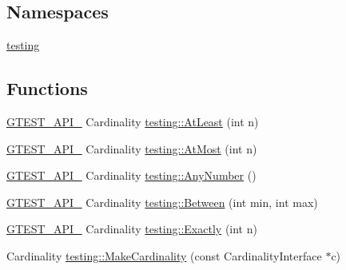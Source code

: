 \subsection*{Namespaces}
\begin{DoxyCompactItemize}
\item 
 \hyperlink{namespacetesting}{testing}
\end{DoxyCompactItemize}
\subsection*{Functions}
\begin{DoxyCompactItemize}
\item 
\hyperlink{gtest-port_8h_aa73be6f0ba4a7456180a94904ce17790}{G\+T\+E\+S\+T\+\_\+\+A\+P\+I\+\_\+} Cardinality \hyperlink{namespacetesting_a137297cb3c582843989fbd937cf0fed2}{testing\+::\+At\+Least} (int n)
\item 
\hyperlink{gtest-port_8h_aa73be6f0ba4a7456180a94904ce17790}{G\+T\+E\+S\+T\+\_\+\+A\+P\+I\+\_\+} Cardinality \hyperlink{namespacetesting_a5487cd1068c78821ced96fbf542a91bb}{testing\+::\+At\+Most} (int n)
\item 
\hyperlink{gtest-port_8h_aa73be6f0ba4a7456180a94904ce17790}{G\+T\+E\+S\+T\+\_\+\+A\+P\+I\+\_\+} Cardinality \hyperlink{namespacetesting_aa1f8a6371097e1e9b8d6866020f35252}{testing\+::\+Any\+Number} ()
\item 
\hyperlink{gtest-port_8h_aa73be6f0ba4a7456180a94904ce17790}{G\+T\+E\+S\+T\+\_\+\+A\+P\+I\+\_\+} Cardinality \hyperlink{namespacetesting_a3bb2d3cdd3fdf5b4be1480fce549918e}{testing\+::\+Between} (int min, int max)
\item 
\hyperlink{gtest-port_8h_aa73be6f0ba4a7456180a94904ce17790}{G\+T\+E\+S\+T\+\_\+\+A\+P\+I\+\_\+} Cardinality \hyperlink{namespacetesting_aa9b1b32ba9e8d3db8ac0af0fc8785c8d}{testing\+::\+Exactly} (int n)
\item 
Cardinality \hyperlink{namespacetesting_af567006969875ab70fc6aa3029576774}{testing\+::\+Make\+Cardinality} (const Cardinality\+Interface $\ast$c)
\end{DoxyCompactItemize}
